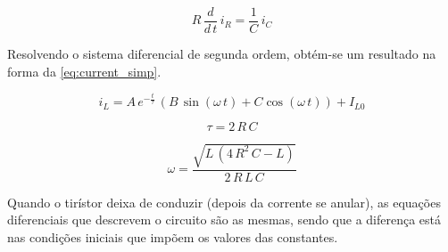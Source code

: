 \documentclass[a4paper,11pt]{article}
\numberwithin{equation}{section}
\begin{document}
\begin{equation}
\label{eq:KVL_2d}
R\,\frac{d}{d\,t}\,i_R = \frac{1}{C}\,i_C
\end{equation}

Resolvendo o sistema diferencial de segunda ordem, obtém-se um resultado na forma da \autoref{eq:current_simp}.

\begin{equation}
\label{eq:current_simp}
i_L = A\, e^{-\frac{t}{\tau}}\,(B\,\sin{(\omega\,t)}+C\cos{(\omega\,t)}) + I_{L0}
\end{equation}

\begin{equation}
\label{eq:time_constant}
\tau = 2\,R\,C
\end{equation}

\begin{equation}
\label{eq:freq}
\omega = \frac{\sqrt{L\,(4\,R^2\,C-L)}}{2\,R\,L\,C}
\end{equation}



Quando o tirístor deixa de conduzir (depois da corrente se anular), as equações diferenciais que descrevem o circuito são as mesmas, sendo que a diferença está nas condições iniciais que impõem os valores das constantes.
\end{document}
